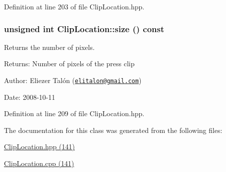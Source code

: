 Definition at line 203 of file ClipLocation.hpp.\hypertarget{class_clip_location_2d01b03e23d610b26bbb2e18278cf5a8}{
\subsubsection[size]{\setlength{\rightskip}{0pt plus 5cm}unsigned int ClipLocation::size () const}}
\label{class_clip_location_2d01b03e23d610b26bbb2e18278cf5a8}


Returns the number of pixels. 

\begin{Desc}
\item[Returns:]Number of pixels of the press clip\end{Desc}
\begin{Desc}
\item[Author:]Eliezer Talón (\href{mailto:elitalon@gmail.com}{\tt elitalon@gmail.com}) \end{Desc}
\begin{Desc}
\item[Date:]2008-10-11 \end{Desc}


Definition at line 209 of file ClipLocation.hpp.

The documentation for this class was generated from the following files:\begin{CompactItemize}
\item 
\hyperlink{_clip_location_8hpp}{ClipLocation.hpp (141)}\item 
\hyperlink{_clip_location_8cpp}{ClipLocation.cpp (141)}\end{CompactItemize}

